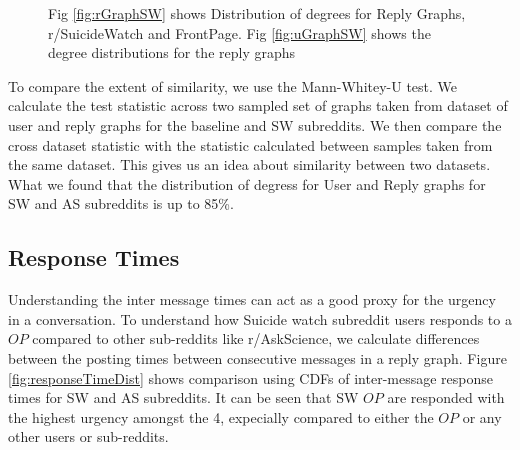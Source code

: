 
\begin{figure}[!ht]
	\centering
\caption{Fig \ref{fig:rGraphSW} shows Distribution of degrees for Reply Graphs,  r/SuicideWatch and FrontPage. Fig \ref{fig:uGraphSW} shows the degree distributions for the reply graphs}
\end{figure}

To compare the extent of similarity, we use the Mann-Whitey-U test. We calculate the test statistic across two sampled set of graphs taken from dataset of user and reply graphs for the baseline and SW subreddits. We then compare the cross dataset statistic with the statistic calculated between samples taken from the same dataset. This gives us an idea about similarity between two datasets. What we found that the distribution of degress for User and Reply graphs for SW and AS subreddits is up to 85\%. 

\subsection{Response Times}
Understanding the inter message times can act as a good proxy for the urgency in a conversation. To understand how Suicide watch subreddit users responds to a $OP$ compared to other sub-reddits like r/AskScience, we calculate differences between the posting times between consecutive messages in a reply graph. Figure \ref{fig:responseTimeDist} shows comparison using CDFs of inter-message response times for SW and AS subreddits. It can be seen that SW $OP$ are responded with the highest urgency amongst the 4, expecially compared to either the $OP$ or any other users or sub-reddits. 

